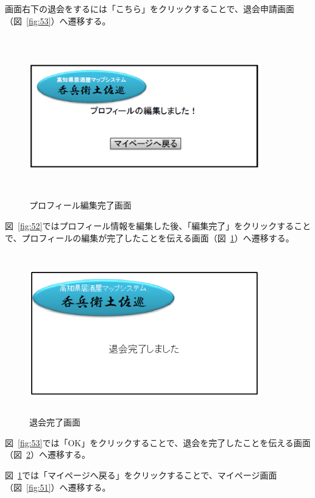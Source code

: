 \documentclass[a4j,titlepage]{jarticle}
\begin{document}
画面右下の退会をするには「こちら」をクリックすることで、退会申請画面（図~\ref{fig:53}）へ遷移する。




\begin {figure}[!htbp]
    \begin{center}
    \includegraphics [height=7cm, width=10cm]{54.eps}
    \caption {プロフィール編集完了画面}
    \label {fig:54}
    \end{center}
\end {figure}



図~\ref{fig:52}ではプロフィール情報を編集した後、「編集完了」をクリックすることで、プロフィールの編集が完了したことを伝える画面（図~\ref{fig:54}）へ遷移する。


\clearpage

\begin {figure}[!htbp]
    \begin{center}
    \includegraphics [height=7cm, width=10cm]{55.eps}
    \caption {退会完了画面}
    \label {fig:55}
    \end{center}
\end {figure}




図~\ref{fig:53}では「OK」をクリックすることで、退会を完了したことを伝える画面（図~\ref{fig:55}）へ遷移する。



図~\ref{fig:54}では「マイページへ戻る」をクリックすることで、マイページ画面（図~\ref{fig:51}）へ遷移する。
\end{document}
